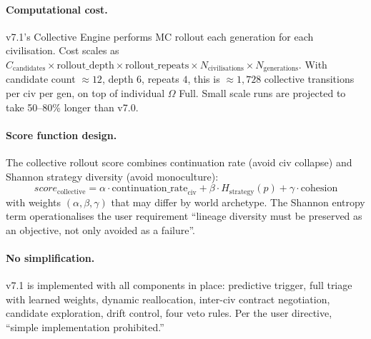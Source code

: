 \paragraph{Computational cost.}
v7.1's Collective Engine performs MC rollout each generation for
each civilisation. Cost scales as $C_{\text{candidates}} \times
\text{rollout\_depth} \times \text{rollout\_repeats} \times
N_{\text{civilisations}} \times N_{\text{generations}}$. With
candidate count $\approx 12$, depth $6$, repeats $4$, this is
$\approx 1{,}728$ collective transitions per civ per gen, on top
of individual $\Omega$ Full. Small scale runs are projected to take
50--80\% longer than v7.0.

\paragraph{Score function design.}
The collective rollout score combines continuation rate (avoid civ
collapse) and Shannon strategy diversity (avoid monoculture):
\[
\mathit{score}_{\text{collective}} =
\alpha \cdot \mathrm{continuation\_rate}_{\text{civ}} +
\beta \cdot H_{\text{strategy}}(p) +
\gamma \cdot \mathrm{cohesion}
\]
with weights $(\alpha, \beta, \gamma)$ that may differ by world
archetype. The Shannon entropy term operationalises the user
requirement ``lineage diversity must be preserved as an objective,
not only avoided as a failure''.

\paragraph{No simplification.}
v7.1 is implemented with all components in place: predictive
trigger, full triage with learned weights, dynamic reallocation,
inter-civ contract negotiation, candidate exploration, drift
control, four veto rules. Per the user directive, ``simple
implementation prohibited.''
